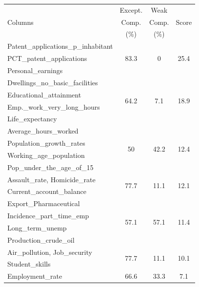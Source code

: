 \begin{table}[!t]
    \centering
    \small
    \begin{tabular}{p{4cm} c c c} 
        \hline
        \multirow{3}{*}{Columns}  & Except. & Weak  & \multirow{3}{*}{Score}\\
                                  & Comp.   & Comp.& \\
                                  & (\%)    & (\%)& \\
        \hline
        Patent\_applications\_p\_inhabitant & \multirow{3}{*}{83.3}
        &\multirow{3}{*}{0} & \multirow{3}{*}{25.4} \\
        PCT\_patent\_applications&&&\\
        Personal\_earnings &&&\\
        \hline
        Dwellings\_no\_basic\_facilities&
        \multirow{4}{*}{64.2} &\multirow{4}{*}{7.1} & \multirow{4}{*}{18.9} \\
        Educational\_attainment&&&\\
        Emp.\_work\_very\_long\_hours&&&\\
        Life\_expectancy&&&\\
        \hline
        Average\_hours\_worked&
        \multirow{4}{*}{50} &\multirow{4}{*}{42.2} & \multirow{4}{*}{12.4} \\
        Population\_growth\_rates&&&\\ 
        Working\_age\_population&&&\\
        Pop\_under\_the\_age\_of\_15&&&\\
        \hline
        Assault\_rate, Homicide\_rate &
        \multirow{2}{*}{77.7} &\multirow{2}{*}{11.1} & \multirow{2}{*}{12.1} \\
        Current\_\-account\_balance&&&\\
        \hline
        Export\_Pharmaceutical&
        \multirow{4}{*}{57.1} &\multirow{4}{*}{57.1} & \multirow{4}{*}{11.4} \\
        Incidence\_part\_time\_emp&&&\\ 
        Long\_term\_unemp&&&\\ 
        Production\_crude\_oil&&&\\ 
        \hline
        Air\_pollution, Job\_security&
        \multirow{2}{*}{77.7} &\multirow{2}{*}{11.1} & \multirow{2}{*}{10.1} \\
        Student\_skills&&&\\
        \hline
        Employment\_rate&
        \multirow{3}{*}{66.6} &\multirow{3}{*}{33.3} & \multirow{3}{*}{7.1} \\

\end{tabular}
\end{table}
